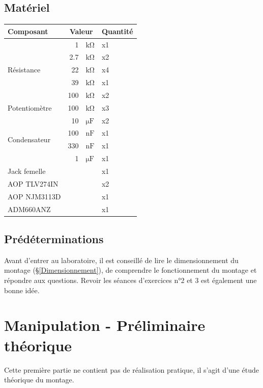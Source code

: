 \documentclass{../template/labo}
\begin{document}
\subsection{Matériel}
\begin{center}
	\begin{tabular}{p{}rlp{}}
		Composant & \multicolumn{2}{c}{Valeur} & Quantité \\\toprule
		\multirow{5}{*}{Résistance} & 1 & $\si{\kohm}$ & x1 \\
									& 2.7 & $\si{\kohm}$ & x2 \\
									& 22 & $\si{\kohm}$ & x4 \\
									& 39 & $\si{\kohm}$ & x1 \\
									& 100 & $\si{\kohm}$ & x2 \\\midrule
		\multirow{1}{*}{Potentiomètre} 	& 100 & $\si{\kohm}$ & x3 \\\midrule
		\multirow{4}{*}{Condensateur} 	& 10 & $\si{\micro\farad}$ & x2 \\
									 	& 100 & $\si{\nano\farad}$ & x1 \\
									 	& 330 & $\si{\nano\farad}$ & x1 \\
									 	& 1 & $\si{\micro\farad}$ & x1 \\\midrule
		\multirow{1}{*}{Jack femelle} 	&  &  & x1 \\\midrule
		\multirow{1}{*}{AOP TLV274IN} 	&  &  & x2 \\\midrule
		\multirow{1}{*}{AOP NJM3113D} 	&  &  & x1 \\\midrule
		\multirow{1}{*}{ADM660ANZ} 	&  &  & x1 \\\bottomrule
	\end{tabular}
\end{center}

\subsection{Prédéterminations} %
Avant d'entrer au laboratoire, il est conseillé de lire le dimensionnement du montage (§\ref{Dimensionnement}), de comprendre le
fonctionnement du montage et répondre aux questions. Revoir les séances d'exercices n°2 et 3 est également une bonne idée.



\clearpage
\section{Manipulation - Préliminaire théorique}
Cette première partie ne contient pas de réalisation pratique, il s'agit d'une étude théorique du montage.
\end{document}
